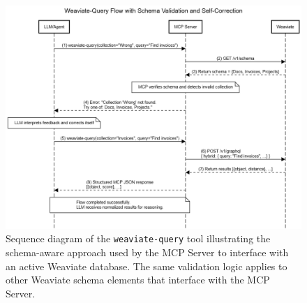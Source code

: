 \begin{figure}
    \centering
    \includegraphics[width=1\linewidth]{Images/Sequence-diagram-Weaviate-Query.png}
   \caption{Sequence diagram of the \texttt{weaviate-query} tool illustrating the schema-aware approach used by the MCP Server to interface with an active Weaviate database. The same validation logic applies to other Weaviate schema elements that interface with the MCP Server.}
    \label{fig:sequence-diagram-weaviate-query}
\end{figure}






